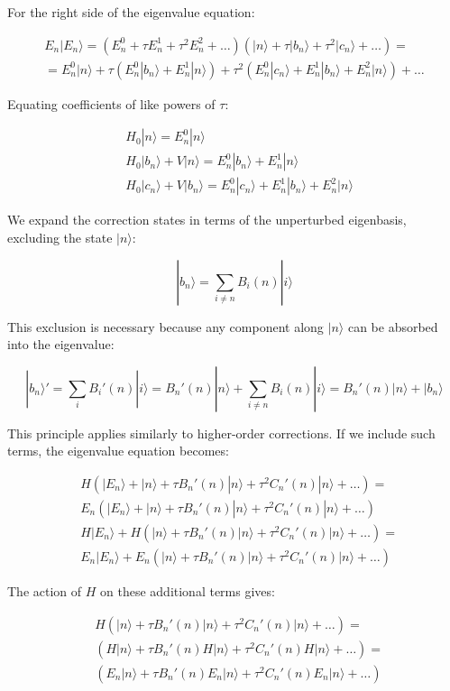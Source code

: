 For the right side of the eigenvalue equation:

\begin{gather}
E_n|E_n\rangle=(E_n^0+\tau E_n^1+\tau^2 E_n^2+\ldots)(|n\rangle+\tau|b_n\rangle+\tau^2|c_n\rangle+\ldots)=\\
=E_n^0|n\rangle+\tau(E_n^0|b_n\rangle+E_n^1|n\rangle)+\tau^2(E_n^0|c_n\rangle+E_n^1|b_n\rangle+E_n^2|n\rangle)+\ldots
\end{gather}

Equating coefficients of like powers of $\tau$:

\begin{align}
&H_0|n\rangle=E_n^0|n\rangle\\
&H_0|b_n\rangle+V|n\rangle=E_n^0|b_n\rangle+E_n^1|n\rangle \\
&H_0|c_n\rangle+V|b_n\rangle=E_n^0|c_n\rangle+E_n^1|b_n\rangle+E_n^2|n\rangle
\end{align}

We expand the correction states in terms of the unperturbed eigenbasis, excluding the state $|n\rangle$:

\begin{equation}
|b_n\rangle=\sum_{i\neq n}B_i(n)|i\rangle
\end{equation}

This exclusion is necessary because any component along $|n\rangle$ can be absorbed into the eigenvalue:

\begin{equation}
|b_n\rangle'=\sum_i B_i'(n)|i\rangle=B_n'(n)|n\rangle+\sum_{i\neq n}B_i(n)|i\rangle=B_n'(n)|n\rangle+|b_n\rangle
\end{equation}

This principle applies similarly to higher-order corrections. If we include such terms, the eigenvalue equation becomes:

\begin{align}
&H(|E_n\rangle+|n\rangle+\tau B_n'(n)|n\rangle+\tau^2 C_n'(n)|n\rangle+\ldots)=\\
&E_n(|E_n\rangle+|n\rangle+\tau B_n'(n)|n\rangle+\tau^2 C_n'(n)|n\rangle+\ldots)\\
&H|E_n\rangle+H(|n\rangle+\tau B_n'(n)|n\rangle+\tau^2 C_n'(n)|n\rangle+\ldots)=\\
&E_n|E_n\rangle+E_n(|n\rangle+\tau B_n'(n)|n\rangle+\tau^2 C_n'(n)|n\rangle+\ldots)
\end{align}

The action of $H$ on these additional terms gives:

\begin{align}
&H(|n\rangle+\tau B_n'(n)|n\rangle+\tau^2 C_n'(n)|n\rangle+\ldots)=\\
&(H|n\rangle+\tau B_n'(n)H|n\rangle+\tau^2 C_n'(n)H|n\rangle+\ldots)=\\
&(E_n|n\rangle+\tau B_n'(n)E_n|n\rangle+\tau^2 C_n'(n)E_n|n\rangle+\ldots)
\end{align}


